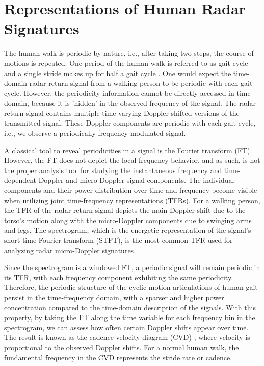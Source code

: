 \section{Representations of Human Radar Signatures}\label{sec:signalrepresentations}

The human walk is periodic by nature, i.e., after taking two steps, the course of motions is repeated. One period of the human walk is referred to as gait cycle and a single stride makes up for half a gait cycle \cite{Che11}. One would expect the time-domain radar return signal from a walking person to be periodic with each gait cycle. However, the periodicity information cannot be directly accessed in time-domain, because it is 'hidden' in the observed frequency of the signal. The radar return signal contains multiple time-varying Doppler shifted versions of the transmitted signal. These Doppler components are periodic with each gait cycle, i.e., we observe a periodically frequency-modulated signal.

A classical tool to reveal periodicities in a signal is the Fourier transform (FT). However, the FT does not depict the local frequency behavior, and as such, is not the proper analysis tool for studying the instantaneous frequency and time-dependent Doppler and micro-Doppler signal components. The individual components and their power distribution over time and frequency become visible when utilizing joint time-frequency representations (TFRs). For a walking person, the TFR of the radar return signal depicts the main Doppler shift due to the torso's motion along with the micro-Doppler components due to swinging arms and legs. The spectrogram, which is the energetic representation of the signal's short-time Fourier transform (STFT), is the most common TFR used for analyzing radar micro-Doppler signatures.

Since the spectrogram is a windowed FT, a periodic signal will remain periodic in its TFR, with each frequency component exhibiting the same periodicity. Therefore, the periodic structure of the cyclic motion articulations of human gait persist in the time-frequency domain, with a sparser and higher power concentration compared to the time-domain description of the signals. With this property, by taking the FT along the time variable for each frequency bin in the spectrogram, we can assess how often certain Doppler shifts appear over time. The result is known as the cadence-velocity diagram (CVD) \cite{Cle15,Bjoe15,Ric15,Ote05}, where velocity is proportional to the observed Doppler shifts. For a normal human walk, the fundamental frequency in the CVD represents the stride rate or cadence.

